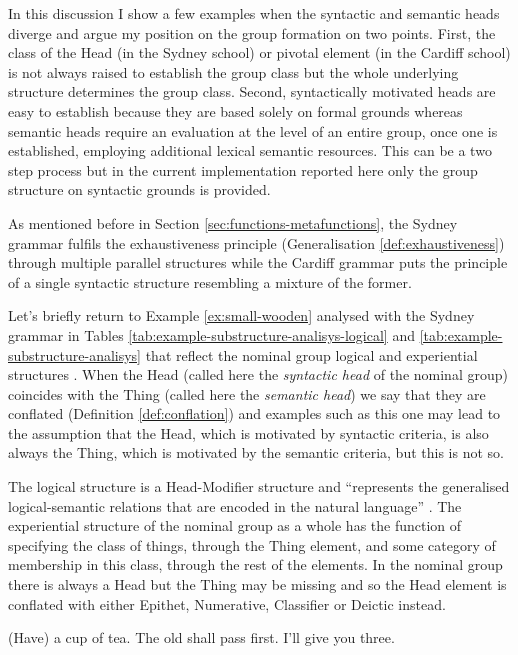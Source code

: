 In this discussion I show a few examples when the syntactic and semantic heads diverge and argue my position on the group formation on two points. First, the class of the Head (in the Sydney school) or pivotal element (in the Cardiff school) is not always raised to establish the group class but the whole underlying structure determines the group class. Second, syntactically motivated heads are easy to establish because they are based solely on formal grounds whereas semantic heads require an evaluation at the level of an entire group, once one is established, employing additional lexical semantic resources. This can be a two step process but in the current implementation reported here only the group structure on syntactic grounds is provided. 

As mentioned before in Section \ref{sec:functions-metafunctions}, the Sydney grammar fulfils the exhaustiveness principle (Generalisation \ref{def:exhaustiveness}) through multiple parallel structures while the Cardiff grammar puts the principle of a single syntactic structure resembling a mixture of the former.

Let's briefly return to Example \ref{ex:small-wooden} analysed with the Sydney grammar in Tables \ref{tab:example-substructure-analisys-logical} and \ref{tab:example-substructure-analisys} that reflect the nominal group logical and experiential structures \citep[391]{Halliday2013}. When the Head (called here the \textit{syntactic head} of the nominal group) coincides with the Thing (called here the \textit{semantic head}) we say that they are conflated (Definition \ref{def:conflation}) and examples such as this one may lead to the assumption that the Head, which is motivated by syntactic criteria, is also always the Thing, which is motivated by the semantic criteria, but this is not so.

The logical structure is a Head-Modifier structure and ``represents the generalised logical-semantic relations that are encoded in the natural language'' \citep[388]{Halliday2013}. The experiential structure of the nominal group as a whole has the function of specifying the class of things, through the Thing element, and some category of membership in this class, through the rest of the elements. In the nominal group there is always a Head but the Thing may be missing and so the Head element is conflated with either Epithet, Numerative, Classifier or Deictic instead.

\begin{exe}
	\ex\label{ex:one} (Have) a cup of tea. 
   	\ex\label{ex:the-old-example} The old shall pass first.
	\ex\label{ex:three} I'll give you three.
\end{exe}


